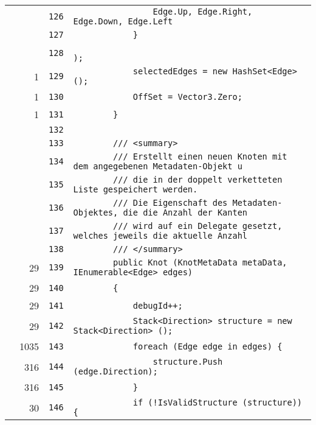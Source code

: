 \documentclass[a4paper,10pt]{article}
\begin{document}
\begin{longtable}[l]{lrrl}
\cellcolor{gray} &  & \verb~126~ & \verb~                Edge.Up, Edge.Right, Edge.Down, Edge.Left~\\
\cellcolor{gray} &  & \verb~127~ & \verb~            }~\\
\cellcolor{gray} &  & \verb~128~ & \verb~                                                 );~\\
\cellcolor{green} & 1 & \verb~129~ & \verb~            selectedEdges = new HashSet<Edge> ();~\\
\cellcolor{green} & 1 & \verb~130~ & \verb~            OffSet = Vector3.Zero;~\\
\cellcolor{green} & 1 & \verb~131~ & \verb~        }~\\
\cellcolor{gray} &  & \verb~132~ & \verb~~\\
\cellcolor{gray} &  & \verb~133~ & \verb~        /// <summary>~\\
\cellcolor{gray} &  & \verb~134~ & \verb~        /// Erstellt einen neuen Knoten mit dem angegebenen Metadaten-Objekt u~\\
\cellcolor{gray} &  & \verb~135~ & \verb~        /// die in der doppelt verketteten Liste gespeichert werden.~\\
\cellcolor{gray} &  & \verb~136~ & \verb~        /// Die Eigenschaft des Metadaten-Objektes, die die Anzahl der Kanten ~\\
\cellcolor{gray} &  & \verb~137~ & \verb~        /// wird auf ein Delegate gesetzt, welches jeweils die aktuelle Anzahl~\\
\cellcolor{gray} &  & \verb~138~ & \verb~        /// </summary>~\\
\cellcolor{green} & 29 & \verb~139~ & \verb~        public Knot (KnotMetaData metaData, IEnumerable<Edge> edges)~\\
\cellcolor{green} & 29 & \verb~140~ & \verb~        {~\\
\cellcolor{green} & 29 & \verb~141~ & \verb~            debugId++;~\\
\cellcolor{green} & 29 & \verb~142~ & \verb~            Stack<Direction> structure = new Stack<Direction> ();~\\
\cellcolor{green} & 1035 & \verb~143~ & \verb~            foreach (Edge edge in edges) {~\\
\cellcolor{green} & 316 & \verb~144~ & \verb~                structure.Push (edge.Direction);~\\
\cellcolor{green} & 316 & \verb~145~ & \verb~            }~\\
\cellcolor{green} & 30 & \verb~146~ & \verb~            if (!IsValidStructure (structure)) {~\\

\end{longtable}
\end{document}
